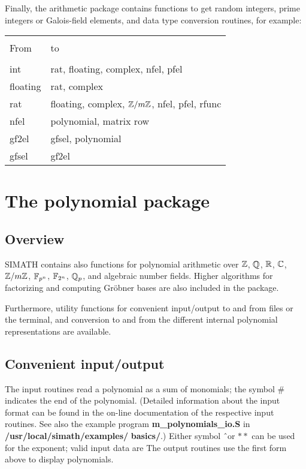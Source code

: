 \leer\leer
Finally, the arithmetic package contains functions to get random integers,
prime integers or Galois-field elements, and data type conversion
routines, for example:
{\bf
\begin{center}
\begin{tabular}{|p{1.0in}|p{2.5in}|}
\hline &\\[-1.3ex]
From &
to\\[1.5ex]
\hline &\\[-1.3ex]
int & rat, floating, complex, nfel, pfel\\
floating & rat, complex\\
rat & floating, complex, $\mbox{$\mathbb Z$}/m\mbox{$\mathbb Z$}$, nfel, \newline
      pfel, rfunc\\
nfel & {\rm polynomial, matrix row}\\
gf2el & gfsel, {\rm polynomial}\\
gfsel & gf2el\\[1.5ex]
\hline
\end{tabular}
\end{center} }

\newpage


\section{The polynomial package}
\subsection{Overview}
SIMATH contains also functions for polynomial arithmetic over $\mbox{$\mathbb Z$}$, $\mbox{$\mathbb Q$}$, $\mbox{$\mathbb R$}$,
$\mbox{$\mathbb C$}$, $\mbox{$\mathbb Z$}/m\mbox{$\mathbb Z$}$, $\mbox{$\mathbb F$}_{p^n}$, $\mbox{$\mathbb F$}_{2^n}$, $\mbox{$\mathbb Q$}\!\,_p$, and algebraic number fields. Higher algorithms for
factorizing and computing Gr\"obner bases are also included in the package.

Furthermore, utility functions for convenient input/output to and from files
or the terminal, and conversion to and from the different internal polynomial
representations are available.

\subsection{Convenient input/output}
The input routines read a polynomial as a sum of monomials; the symbol \# indicates the
end of the polynomial. (Detailed information about the input format can be found in the
on-line documentation of the respective input routines. See also the example
program {\bf m\_polynomials\_io.S} in {\bf /usr/local/simath/examples/} {\bf basics/}.)
Either symbol \^\ or $**$ can
be used for the exponent; valid input data are
The output routines use the first form above to display polynomials.


